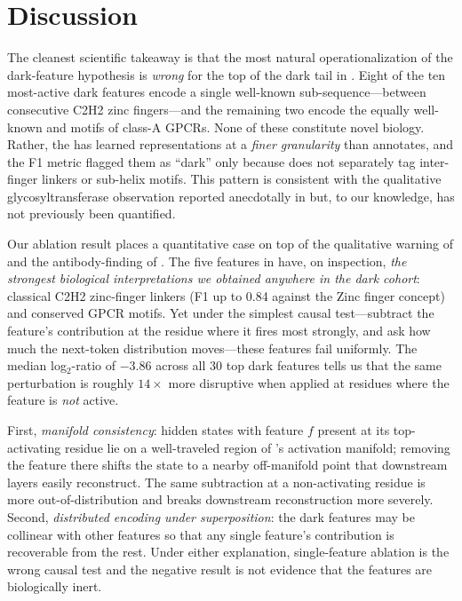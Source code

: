 \section{Discussion}
\label{sec:discussion}

 The cleanest scientific takeaway is that the most natural operationalization of the dark-feature hypothesis is \emph{wrong} for the top of the dark tail in \esm. Eight of the ten most-active dark features encode a single well-known sub-sequence---\tgekp between consecutive C2H2 zinc fingers---and the remaining two encode the equally well-known \dry and \npxxy motifs of class-A GPCRs. None of these constitute novel biology. Rather, the \sae has learned representations at a \emph{finer granularity} than \swissprot annotates, and the F1 metric flagged them as ``dark'' only because \swissprot does not separately tag inter-finger linkers or sub-helix motifs. This pattern is consistent with the qualitative glycosyltransferase observation reported anecdotally in \citet{simon2024interplm} but, to our knowledge, has not previously been quantified.

 Our ablation result places a quantitative case on top of the qualitative warning of \citet{bricken2026actionability} and the antibody-\plm finding of \citet{haque2026antibody}. The five features in  have, on inspection, \emph{the strongest biological interpretations we obtained anywhere in the dark cohort}: classical C2H2 zinc-finger linkers (F1 up to 0.84 against the Zinc finger concept) and conserved GPCR motifs. Yet under the simplest causal test---subtract the feature's contribution at the residue where it fires most strongly, and ask how much the next-token distribution moves---these features fail uniformly. The median log$_2$-ratio of $-3.86$ across all 30 top dark features tells us that the same perturbation is roughly $14\times$ more disruptive when applied at residues where the feature is \emph{not} active.

 First, \emph{manifold consistency}: hidden states with feature $f$ present at its top-activating residue lie on a well-traveled region of \esm's activation manifold; removing the feature there shifts the state to a nearby off-manifold point that downstream layers easily reconstruct. The same subtraction at a non-activating residue is more out-of-distribution and breaks downstream reconstruction more severely. Second, \emph{distributed encoding under superposition}: the dark features may be collinear with other features so that any single feature's contribution is recoverable from the rest. Under either explanation, single-feature ablation is the wrong causal test and the negative result is not evidence that the features are biologically inert.

